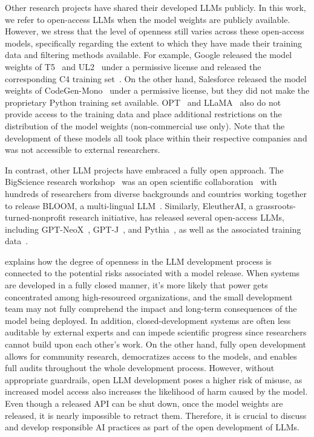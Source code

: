 Other research projects have shared their developed LLMs publicly. In this work, we refer to open-access LLMs when the model weights are publicly available. However, we stress that the level of openness still varies across these open-access models, specifically regarding the extent to which they have made their training data and filtering methods available. For example, Google released the model weights of T5~\citep{raffel2020exploring} and UL2~\citep{tay2022unifying} under a permissive license and released the corresponding C4 training set~\citep{raffel2020exploring}. On the other hand, Salesforce released the model weights of CodeGen-Mono~\citep{nijkamp:codegen} under a permissive license, but they did not make the proprietary Python training set available. OPT~\citep{zhang2022opt} and LLaMA~\citep{touvron2023llama} also do not provide access to the training data and place additional restrictions on the distribution of the model weights (non-commercial use only). Note that the development of these models all took place within their respective companies and was not accessible to external researchers. 

In contrast, other LLM projects have embraced a fully open approach. The BigScience research workshop~\citep{bigscience_workshop_2022} was an open scientific collaboration~\citep{akiki-bigscience-22} with hundreds of researchers from diverse backgrounds and countries working together to release BLOOM, a multi-lingual LLM~\citep{scao2022bloom,muennighoff2022crosslingual}. Similarly, EleutherAI, a grassroots-turned-nonprofit research initiative, has released several open-access LLMs, including GPT-NeoX~\citep{black2022gpt}, GPT-J~\citep{wang2021gpt}, and Pythia~\citep{biderman2023pythia}, as well as the associated training data~\citep{gao2020pile}. 


\citet{solaiman2023gradient} explains how the degree of openness in the LLM development process is connected to the potential risks associated with a model release. When systems are developed in a fully closed manner, it's more likely that power gets concentrated among high-resourced organizations, and the small development team may not fully comprehend the impact and long-term consequences of the model being deployed. In addition, closed-development systems are often less auditable by external experts and can impede scientific progress since researchers cannot build upon each other's work. On the other hand, fully open development allows for community research, democratizes access to the models, and enables full audits throughout the whole development process. However, without appropriate guardrails, open LLM development poses a higher risk of misuse, as increased model access also increases the likelihood of harm caused by the model. Even though a released API can be shut down, once the model weights are released, it is nearly impossible to retract them.  Therefore, it is crucial to discuss and develop responsible AI practices as part of the open development of LLMs.

